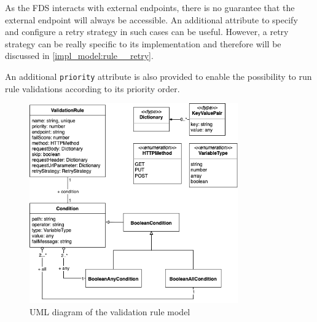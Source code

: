     As the FDS interacts with external endpoints, there is no guarantee that the external endpoint will always be accessible. An additional attribute to specify and configure a retry strategy in such cases can be useful. However, a retry strategy can be really specific to its implementation and therefore will be discussed in \autoref{impl_model:rule__retry}.

    An additional \verb;priority; attribute is also provided to enable the possibility to run rule validations according to its priority order.

    \begin{figure}[!ht]
      \includegraphics[width=0.8\textwidth]{diagrams/entity-validationrule.png}
      \caption{UML diagram of the validation rule model}
      \label{fig:uml_validation_rule}
    \end{figure}
    
